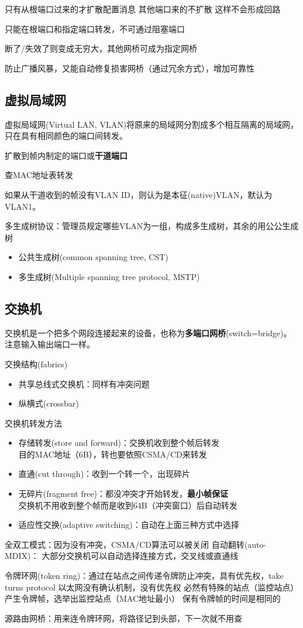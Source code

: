 只有从根端口过来的才扩散配置消息
其他端口来的不扩散
这样不会形成回路

只能在根端口和指定端口转发，不可通过阻塞端口

断了/失效了则变成无穷大，其他网桥可成为指定网桥

防止广播风暴，又能自动修复损害网桥（通过冗余方式），增加可靠性

\subsection{虚拟局域网}
虚拟局域网(Virtual LAN, VLAN)将原来的局域网分割成多个相互隔离的局域网，只在具有相同颜色的端口间转发。

扩散到帧内制定的端口或\textbf{干道端口}

查MAC地址表转发

如果从干道收到的帧没有VLAN ID，则认为是本征(native)VLAN，默认为VLAN1。

多生成树协议：管理员规定哪些VLAN为一组，构成多生成树，其余的用公公生成树
\begin{itemize}
	\item 公共生成树(common spanning tree, CST)
	\item 多生成树(Multiple spanning tree protocol, MSTP)
\end{itemize}

\subsection{交换机}
交换机是一个把多个网段连接起来的设备，也称为\textbf{多端口网桥}(switch=bridge)。
注意输入输出端口一样。

交换结构(fabrics)
\begin{itemize}
	\item 共享总线式交换机：同样有冲突问题
	\item 纵横式(crossbar)
\end{itemize}

交换机转发方法
\begin{itemize}
\item 存储转发(store and forward)：交换机收到整个帧后转发\\
目的MAC地址（6B），转也要依照CSMA/CD来转发
\item 直通(cut through)：收到一个转一个，出现碎片\\
\item 无碎片(fragment free)：都没冲突才开始转发，\textbf{最小帧保证}\\
交换机不用收到整个帧而是收到64B（冲突窗口）后自动转发
\item 适应性交换(adaptive switching)：自动在上面三种方式中选择
\end{itemize}
全双工模式：因为没有冲突，CSMA/CD算法可以被关闭
自动翻转(auto-MDIX)：
大部分交换机可以自动选择连接方式，交叉线或直通线

令牌环网(token ring)：通过在站点之间传递令牌防止冲突，具有优先权，take turns protocol
以太网没有确认机制，没有优先权
必然有特殊的站点（监控站点）产生令牌帧，选举出监控站点（MAC地址最小）
保有令牌帧的时间是相同的

源路由网桥：用来连令牌环网，将路径记到头部，下一次就不用查